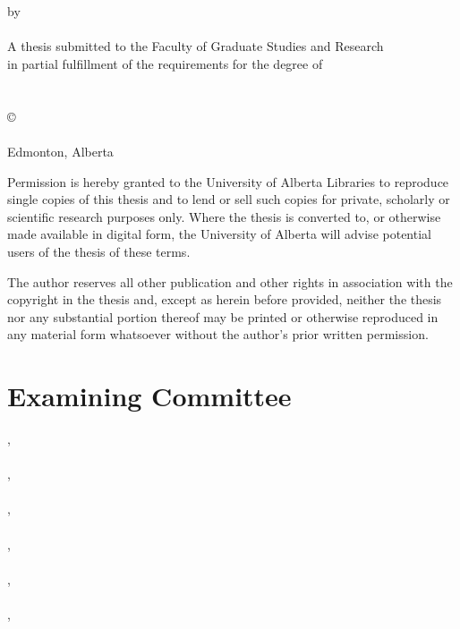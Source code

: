   \begin{center}
    \Large{\textbf{\school}}  \\ [.6in]
    \Large{\textbf{\thesistitle}} \\ [.1in]
    \normalsize{by} \\ [.1in]
    \Large{\textbf{\name}}  \\ [.6in]
    \normalsize{A thesis submitted to the Faculty of Graduate Studies and Research \\ 
    in partial fulfillment of the requirements for the degree of} \\ [0.1in]
    \Large{\textbf{\program}} \\ [.1in]
    \normalsize{\dept} \\ [0.6in]  
    \scriptsize{\copyright\:\name} \\
    \scriptsize{\semester} \\
    \scriptsize{Edmonton, Alberta} \\ [0.6in]  
    \scriptsize{Permission is hereby granted to the University of Alberta Libraries to reproduce single copies of this thesis and to lend or sell such copies for private, scholarly or scientific research purposes only. Where the thesis is converted to, or otherwise made available in digital form, the University of Alberta will advise potential users of the thesis of these terms.
    
The author reserves all other publication and other rights in association with the copyright in the thesis and, except as herein before provided, neither the thesis nor any substantial portion thereof may be printed or otherwise reproduced in any material form whatsoever without the author's prior written permission.}
  \end{center}

  \newpage
  \chapter*{Examining Committee}
  \thispagestyle{empty}
     \supervisor, \; \superloc \\ \\
     \coma, \; \loca \\ \\
     \comb, \; \locb \\ \\
     \comc, \; \locc \\ \\
     \comd, \; \locd \\ \\
     \come, \; \loce
  
